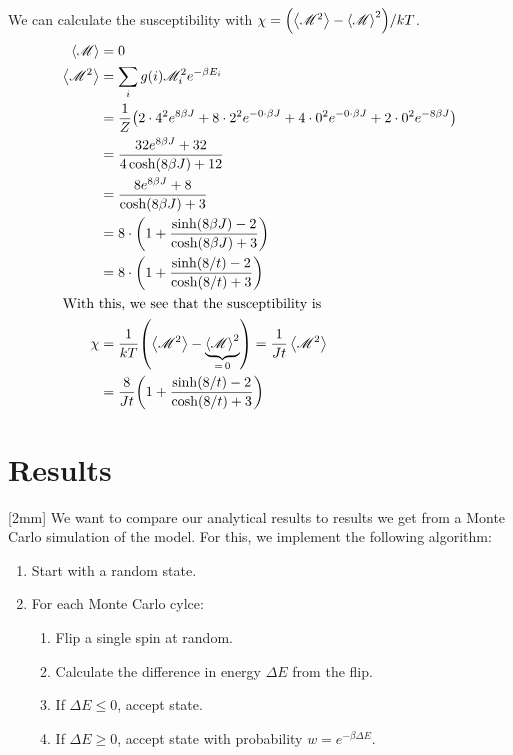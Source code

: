 \documentclass[12pt,a4paper]{article}
\newcommand\M[1]{\begin{bmatrix} #1 \end{bmatrix}} %
\def\M{\mathscr{M}}
\newcommand\oppg[1]{\reversemarginnote{\textcolor{black!40}{#1)}}[2mm]}
\begin{document}
We can calculate the susceptibility with $\chi = \qty( \expval{\M^2} - \expval{\M}^2 ) / k T$.
\begin{align}
  \expval{\M} &= 0 \\
  \expval{\M^2} &= \sum_i g(i) \M_i^2 e^{- \beta E_i} \\
    &= \frac{1}{Z} \qty( 2 \cdot 4^2 e^{8 \beta J} + 8 \cdot 2^2 e^{- 0 \cdot \beta J } + 4 \cdot 0^2 e^{-0 \cdot \beta J} + 2 \cdot 0^2 e^{-8 \beta J} ) \\
    &= \frac{32 e^{8 \beta J} + 32}{4 \cosh(8 \beta J) + 12} \\
    &= \frac{8 e^{8 \beta J} + 8}{\cosh(8 \beta J) + 3} \\
    &= 8 \cdot \qty( 1 + \frac{\sinh(8 \beta J) - 2}{\cosh(8 \beta J) + 3} ) \\
    &= 8 \cdot \qty( 1 + \frac{\sinh(8/t) - 2}{\cosh(8/t) + 3} ) \\
\intertext{With this, we see that the susceptibility is}
  \chi &= \frac{1}{k T} \qty( \expval{\M^2} - \underbrace{\expval{\M}^2}_{= \, 0} ) = \frac{1}{Jt} \expval{\M^2} \\
    &= \frac{8}{J t} \qty( 1 + \frac{\sinh(8/t) - 2}{\cosh(8/t) + 3} )
\end{align}

\clearpage
\section{Results}

\oppg{b}
We want to compare our analytical results to results we get from a Monte Carlo simulation of the model.
For this, we implement the following algorithm:

\begin{enumerate}
  \item Start with a random state.
  \item For each Monte Carlo cylce:
    \begin{enumerate}
      \item Flip a single spin at random.
      \item Calculate the difference in energy $\Delta{E}$ from the flip.
      \item If $\Delta{E} \le 0$, accept state.
      \item If $\Delta{E} \ge 0$, accept state with probability $w = e^{-\beta \Delta{E}}$.
    \end{enumerate}
\end{enumerate}
\end{document}
